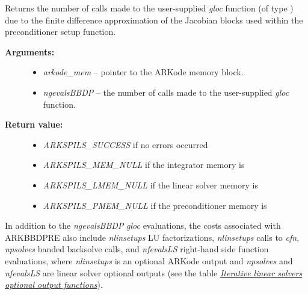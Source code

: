 \documentclass[letterpaper,10pt,english]{sphinxmanual}
\begin{document}

\begin{fulllineitems}
\label{c_interface/Preconditioners:ARKBBDPrecGetNumGfnEvals}
Returns the number of calls made to the user-supplied
\emph{gloc} function (of type {\hyperref[c_interface/Preconditioners:ARKLocalFn]{}}) due to the finite
difference approximation of the Jacobian blocks used within the
preconditioner setup function.
\begin{description}
\item[{\textbf{Arguments:}}] \leavevmode\begin{itemize}
\item {} 
\emph{arkode\_mem} -- pointer to the ARKode memory block.

\item {} 
\emph{ngevalsBBDP} -- the number of calls made to the user-supplied
\emph{gloc} function.

\end{itemize}

\item[{\textbf{Return value:}}] \leavevmode\begin{itemize}
\item {} 
\emph{ARKSPILS\_SUCCESS} if no errors occurred

\item {} 
\emph{ARKSPILS\_MEM\_NULL} if the integrator memory is 

\item {} 
\emph{ARKSPILS\_LMEM\_NULL} if the linear solver memory is 

\item {} 
\emph{ARKSPILS\_PMEM\_NULL} if the preconditioner memory is 

\end{itemize}

\end{description}

\end{fulllineitems}


In addition to the \emph{ngevalsBBDP} \emph{gloc} evaluations, the costs
associated with ARKBBDPRE also include \emph{nlinsetups} LU
factorizations, \emph{nlinsetups} calls to \emph{cfn}, \emph{npsolves} banded
backsolve calls, and \emph{nfevalsLS} right-hand side function
evaluations, where \emph{nlinsetups} is an optional ARKode output and
\emph{npsolves} and \emph{nfevalsLS} are linear solver optional outputs (see
the table {\hyperref[c_interface/User_callable:cinterface-arkspilsoutputs]{\emph{Iterative linear solvers optional output functions}}}).
\end{document}
